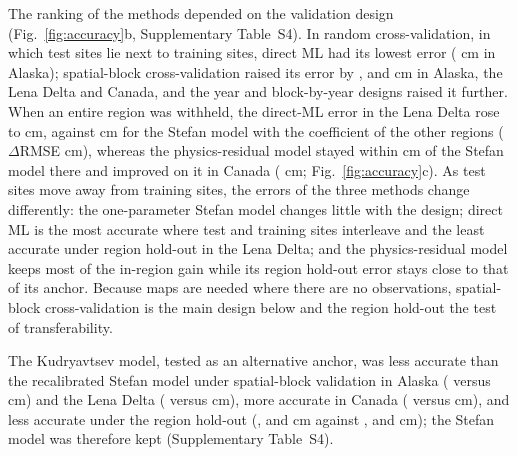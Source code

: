 
The ranking of the methods depended on the validation design (Fig.~\ref{fig:accuracy}b, Supplementary Table~S4). In random cross-validation, in which test sites lie next to training sites, direct ML had its lowest error (\nrmseAkrandDz{} cm in Alaska); spatial-block cross-validation raised its error by \noptimAkDz, \noptimLeDz{} and \noptimCaDz{} cm in Alaska, the Lena Delta and Canada, and the year and block-by-year designs raised it further. When an entire region was withheld, the direct-ML error in the Lena Delta rose to \nrmseLeregDz{} cm, against \nrmseLeregPz{} cm for the Stefan model with the coefficient of the other regions ($\Delta$RMSE \ndrefLeregDz{} cm), whereas the physics-residual model stayed within \ndrefLeregRoabs{} cm of the Stefan model there and improved on it in Canada (\ndrefCaregRo{} cm; Fig.~\ref{fig:accuracy}c). As test sites move away from training sites, the errors of the three methods change differently: the one-parameter Stefan model changes little with the design; direct ML is the most accurate where test and training sites interleave and the least accurate under region hold-out in the Lena Delta; and the physics-residual model keeps most of the in-region gain while its region hold-out error stays close to that of its anchor. Because maps are needed where there are no observations, spatial-block cross-validation is the main design below and the region hold-out the test of transferability.

The Kudryavtsev model, tested as an alternative anchor, was less accurate than the recalibrated Stefan model under spatial-block validation in Alaska (\nkuAkblk{} versus \nrmseAkblkPo{} cm) and the Lena Delta (\nkuLeblk{} versus \nrmseLeblkPo{} cm), more accurate in Canada (\nkuCablk{} versus \nrmseCablkPo{} cm), and less accurate under the region hold-out (\nrmseAkregKu{}, \nrmseLeregKu{} and \nrmseCaregKu{} cm against \nrmseAkregPz{}, \nrmseLeregPz{} and \nrmseCaregPz{} cm); the Stefan model was therefore kept (Supplementary Table~S4).

